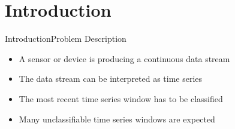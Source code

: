 \section{Introduction}
\begin{frame}{Introduction}{Problem Description}
    \begin{itemize}
        \item A sensor or device is producing a continuous data stream
        
        \item The data stream can be interpreted as time series
        
        \item The most recent time series window has to be classified
        
        \item Many unclassifiable time series windows are expected
    \end{itemize}
\end{frame}
